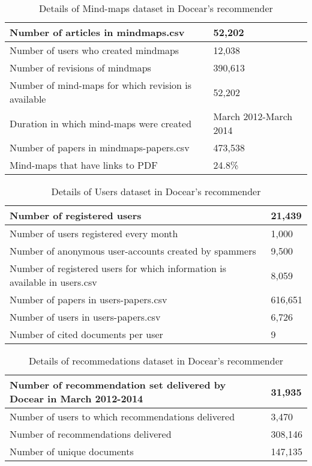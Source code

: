\begin{table}[!htbp] 
\centering
\footnotesize
\def\arraystretch{1.4}%
\centering
\begin{tabular}{|p{8cm}|p{2cm}|}
\hline
Number of articles in mindmaps.csv & 52,202
\\
\hline
Number of users who created mindmaps & 12,038
\\
\hline 
Number of revisions of mindmaps & 390,613
\\
\hline 
Number of mind-maps for which revision is available & 52,202
\\
\hline
Duration in which mind-maps were created & March 2012-March 2014
\\
\hline
Number of papers in mindmaps-papers.csv & 473,538
\\
\hline
Mind-maps that have links to PDF  & 24.8\%
\\
\hline
\end{tabular}

\caption{Details of Mind-maps dataset in Docear's recommender}
\label{table:3}
\end{table}

\begin{table}[!htbp] 
\centering
\footnotesize
\def\arraystretch{1.4}%
\centering
\begin{tabular}{|p{8cm}|p{2cm}|}
\hline
Number of registered users & 21,439
\\
\hline
Number of users registered every month & 1,000
\\
\hline 
Number of anonymous user-accounts created by spammers & 9,500
\\
\hline 
Number of registered users for which information is available in users.csv & 8,059
\\
\hline
Number of papers in users-papers.csv & 616,651
\\
\hline
Number of users in users-papers.csv & 6,726
\\
\hline
Number of cited documents per user & 9
\\
\hline
\end{tabular}

\caption{Details of Users dataset in Docear's recommender}
\label{table:4}
\end{table}



\begin{table}[!htbp] 
\centering
\footnotesize
\def\arraystretch{1.4}%
\centering
\begin{tabular}{|p{8cm}|p{2cm}|}
\hline
Number of recommendation set delivered by Docear in March 2012-2014 & 31,935
\\
\hline
Number of users to which recommendations delivered & 3,470
\\
\hline 
Number of recommendations delivered & 308,146
\\
\hline 
Number of unique documents & 147,135
\\
\hline
\end{tabular}

\caption{Details of recommedations dataset in Docear's recommender}
\label{table:5}
\end{table}
